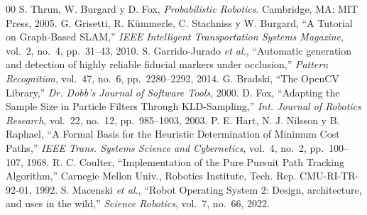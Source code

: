 \documentclass[conference]{IEEEtran}
\begin{document}


\begin{thebibliography}{00}
 S. Thrun, W. Burgard y D. Fox, \emph{Probabilistic Robotics}. Cambridge, MA: MIT Press, 2005.
 G. Grisetti, R. Kümmerle, C. Stachniss y W. Burgard, ``A Tutorial on Graph-Based SLAM,'' \emph{IEEE Intelligent Transportation Systems Magazine}, vol.~2, no.~4, pp.~31--43, 2010.
 S. Garrido-Jurado \emph{et al.}, ``Automatic generation and detection of highly reliable fiducial markers under occlusion,'' \emph{Pattern Recognition}, vol.~47, no.~6, pp.~2280--2292, 2014.
 G. Bradski, ``The OpenCV Library,'' \emph{Dr. Dobb's Journal of Software Tools}, 2000.
 D. Fox, ``Adapting the Sample Size in Particle Filters Through KLD-Sampling,'' \emph{Int. Journal of Robotics Research}, vol.~22, no.~12, pp.~985--1003, 2003.
 P. E. Hart, N. J. Nilsson y B. Raphael, ``A Formal Basis for the Heuristic Determination of Minimum Cost Paths,'' \emph{IEEE Trans. Systems Science and Cybernetics}, vol.~4, no.~2, pp.~100--107, 1968.
 R. C. Coulter, ``Implementation of the Pure Pursuit Path Tracking Algorithm,'' Carnegie Mellon Univ., Robotics Institute, Tech. Rep. CMU-RI-TR-92-01, 1992.
 S. Macenski \emph{et al.}, ``Robot Operating System 2: Design, architecture, and uses in the wild,'' \emph{Science Robotics}, vol.~7, no.~66, 2022.
\end{thebibliography}
\end{document}
